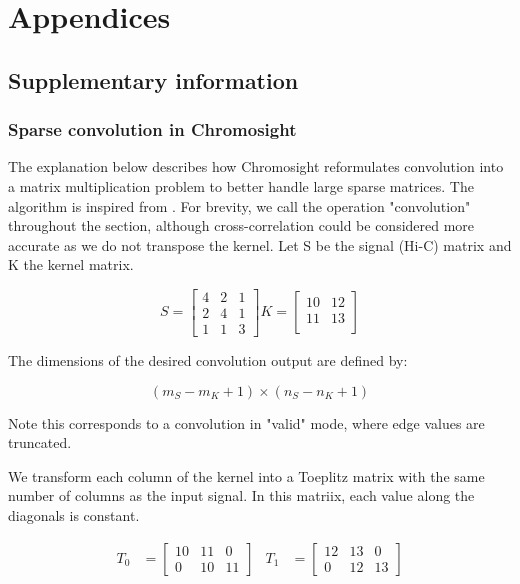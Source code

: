 \ctpartquote{}
\ctparttext{}
\part{Appendices}

\chapter{Supplementary information}
\label{ch:04-A:supdata}

    \section{Sparse convolution in Chromosight}
    \label{sec:04-A-01:convolution}

The explanation below describes how Chromosight reformulates convolution into a matrix multiplication problem to better handle large sparse matrices. The algorithm is inspired from \cite{NeuralNetwork2D}. For brevity, we call the operation "convolution" throughout the section, although cross-correlation could be considered more accurate as we do not transpose the kernel. Let S be the signal (Hi-C) matrix and K the kernel matrix.

\begin{equation}
    S = 
    \begin{bmatrix}
        4 & 2 & 1 \\
        2 & 4 & 1 \\
        1 & 1 & 3
    \end{bmatrix}
    K =
    \begin{bmatrix}
        10 & 12 \\
        11 & 13 \\
    \end{bmatrix}
\end{equation}

The dimensions of the desired convolution output are defined by:

\begin{equation}
    (m_S - m_K + 1) \times (n_S - n_K + 1)
\end{equation}

Note this corresponds to a convolution in "valid" mode, where edge values are truncated.

We transform each column of the kernel into a Toeplitz matrix with the same number of columns as the input signal. In this matriix, each value along the diagonals is constant.

\begin{align}
    T_0 &=
    \begin{bmatrix}
        10 & 11 & 0 \\
        0  & 10 & 11
    \end{bmatrix} &
    T_1 &=
    \begin{bmatrix}
        12 & 13 & 0 \\
        0  & 12 & 13
    \end{bmatrix}
\end{align}

